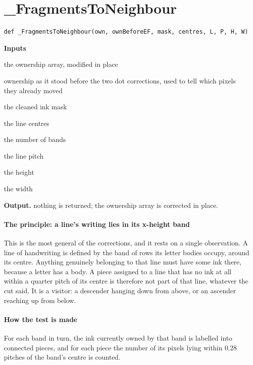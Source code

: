 \section{\_FragmentsToNeighbour}
\begin{lstlisting}[style=sig]
def _FragmentsToNeighbour(own, ownBeforeEF, mask, centres, L, P, H, W)
\end{lstlisting}

\noindent\textbf{Inputs}
\begin{description}[leftmargin=2.2em,style=nextline,font=\normalfont\ttfamily]\setlength\itemsep{1pt}
  \item[{own}] \normalfont the ownership array, modified in place
  \item[{ownBeforeEF}] \normalfont ownership as it stood before the two dot corrections, used to tell which pixels they already moved
  \item[{mask}] \normalfont the cleaned ink mask
  \item[{centres}] \normalfont the line centres
  \item[{L}] \normalfont the number of bands
  \item[{P}] \normalfont the line pitch
  \item[{H}] \normalfont the height
  \item[{W}] \normalfont the width
\end{description}

\noindent\textbf{Output.} nothing is returned; the ownership array is corrected in place.


\paragraph{The principle: a line's writing lies in its x-height band}
This is the most general of the corrections, and it rests on a single observation. A line of handwriting is defined by the band of rows its letter bodies occupy, around its centre. Anything genuinely belonging to that line must have some ink there, because a letter has a body. A piece assigned to a line that has no ink at all within a quarter pitch of its centre is therefore not part of that line, whatever the cut said. It is a visitor: a descender hanging down from above, or an ascender reaching up from below.


\paragraph{How the test is made}
For each band in turn, the ink currently owned by that band is labelled into connected pieces, and for each piece the number of its pixels lying within 0.28 pitches of the band's centre is counted.


